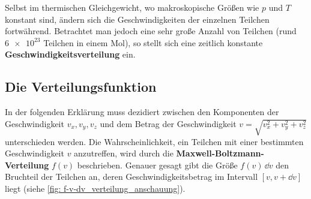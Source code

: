 Selbst im thermischen Gleichgewicht, wo makroskopische Größen wie $p$ und $T$ konstant sind, ändern sich die Geschwindigkeiten der einzelnen Teilchen fortwährend.
Betrachtet man jedoch eine sehr große Anzahl von Teilchen (\zB rund $\num{6e23}$ Teilchen in einem Mol), so stellt sich eine zeitlich konstante \textbf{Geschwindigkeitsverteilung} ein.

\subsection{Die Verteilungsfunktion}\label{subsec: verteilungsfunktion}
In der folgenden Erklärung muss dezidiert zwischen den Komponenten der Geschwindigkeit $v_x,v_y,v_z$ und dem Betrag der Geschwindigkeit $v = \sqrt{v_x^2 + v_y^2 + v_z^2}$ unterschieden werden.
Die Wahrscheinlichkeit, ein Teilchen mit einer bestimmten Geschwindigkeit $v$ anzutreffen, wird durch die \textbf{Maxwell-Boltzmann-Verteilung} $f(v)$ beschrieben.
Genauer gesagt gibt die Größe $f(v)\,\dd v$ den Bruchteil der Teilchen an, deren Geschwindigkeitsbetrag im Intervall $[v, v+\dd v]$ liegt (siehe \cref{fig: f-v-dv_verteilung_anschauung}).

